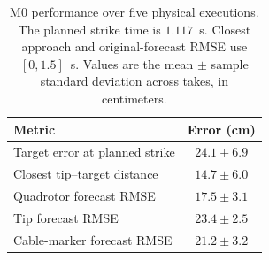 \begin{table}[t]
\centering
\caption{M0 performance over five physical executions. The planned strike time is $1.117$~s. Closest approach and original-forecast RMSE use $[0,1.5]$~s. Values are the mean $\pm$ sample standard deviation across takes, in centimeters.}
\label{tab:m0_initial_evaluation}
\begin{tabular}{lc}
\hline
Metric & Error (cm) \\
\hline
Target error at planned strike & $24.1 \pm 6.9$ \\
Closest tip--target distance & $14.7 \pm 6.0$ \\
Quadrotor forecast RMSE & $17.5 \pm 3.1$ \\
Tip forecast RMSE & $23.4 \pm 2.5$ \\
Cable-marker forecast RMSE & $21.2 \pm 3.2$ \\
\hline
\end{tabular}
\end{table}
